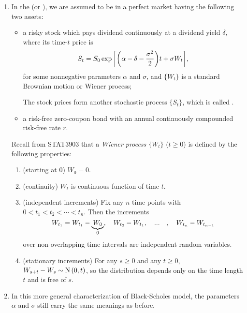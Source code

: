 \begin{enumerate}
\item\label{it:bs-model-formulation} In the  (or
), we are assumed to be in a perfect market
having the following two assets:
\begin{itemize}
\item a risky stock  which pays dividend continuously
at a dividend yield \(\delta\), where its time-\(t\) price is
\[
S_t=S_0\exp\qty[\qty(\alpha-\delta-\frac{\sigma^2}{2})t+\sigma W_t],
\]
for some nonnegative parameters \(\alpha\) and \(\sigma\), and \(\{W_t\}\) is a
standard Brownian motion or Wiener process;
\begin{note}
The stock prices form another stochastic process \(\{S_t\}\), which is called
.
\end{note}
\item a risk-free zero-coupon bond  with an
annual continuously compounded risk-free rate \(r\).
\end{itemize}
Recall from STAT3903 that a \emph{Wiener process} \(\{W_t\}\) (\(t\ge 0\)) is
defined by the following properties:
\begin{enumerate}
\item (starting at \(0\)) \(W_0=0\).
\item (continuity) \(W_t\) is continuous function of time \(t\).
\item (independent increments) Fix any \(n\) time points with
\(0<t_1<t_2<\dotsb<t_n\). Then the increments
\[
W_{t_1}=W_{t_1}-\underbrace{W_0}_{0},\quad W_{t_2}-W_{t_1},\qqtext{...},\quad
W_{t_n}-W_{t_{n-1}}
\]
over non-overlapping time intervals are independent random variables.
\item (stationary increments) For any \(s\ge 0\) and any \(t\ge 0\),
\(W_{s+t}-W_{s}\sim \operatorname{N}\qty(0,t)\), so the distribution depends only on the time
length \(t\) and is free of \(s\).
\end{enumerate}

\item In this more general characterization of Black-Scholes model, the
parameters \(\alpha\) and \(\sigma\) still carry the same meanings as before.


\end{enumerate}
